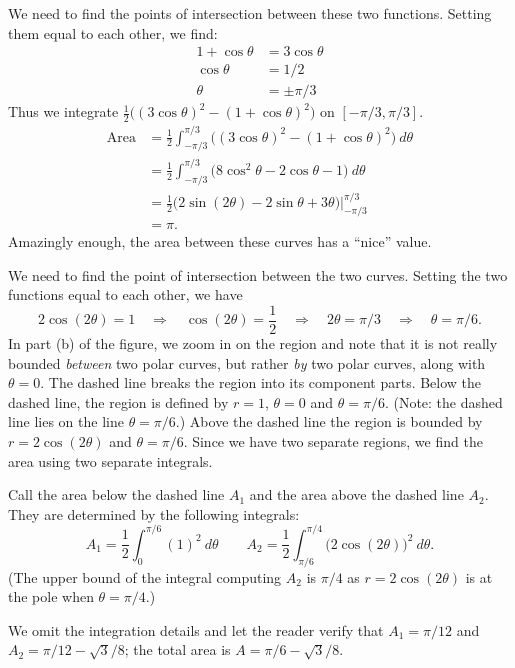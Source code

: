 {We need to find the points of intersection between these two functions. Setting them equal to each other, we find:
\begin{align*}
1+\cos\theta &= 3\cos \theta \\
 \cos\theta &=1/2\\
\theta &= \pm \pi/3
\end{align*}
Thus we integrate $\frac12\big((3\cos\theta)^2-(1+\cos\theta)^2\big)$ on $[-\pi/3,\pi/3]$.
\begin{align*}
	\text{Area}
	&= \frac12\int_{-\pi/3}^{\pi/3} \big((3\cos\theta)^2-(1+\cos\theta)^2\big)\ d\theta\\
	&= \frac12\int_{-\pi/3}^{\pi/3} \big( 8\cos^2\theta-2\cos\theta-1\big)\ d\theta \\
	&= \frac12\big(2\sin(2\theta) - 2\sin\theta+3\theta\big)\Bigg|_{-\pi/3}^{\pi/3}\\
	&= \pi.
\end{align*}
Amazingly enough, the area between these curves has a ``nice'' value.}

{We need to find the point of intersection between the two curves. Setting the two functions equal to each other, we have
$$2\cos(2\theta) = 1 \quad \Rightarrow \quad \cos(2\theta) = \frac12 \quad \Rightarrow \quad 2\theta = \pi/3\quad \Rightarrow \quad \theta=\pi/6.$$
In part (b) of the figure, we zoom in on the region and note that it is not really bounded \textit{between} two polar curves, but rather \textit{by} two polar curves, along with $\theta=0$. The dashed line breaks the region into its component parts. Below the dashed line, the region is defined by $r=1$, $\theta=0$ and $\theta = \pi/6$. (Note: the dashed line lies on the line $\theta=\pi/6$.) Above the dashed line the region is bounded by $r=2\cos(2\theta)$ and $\theta =\pi/6$. Since we have two separate regions, we find the area using two separate integrals.

Call the area below the dashed line $A_1$ and the area above the dashed line $A_2$. They are determined by the following integrals:
$$A_1 = \frac12\int_0^{\pi/6} (1)^2\ d\theta\qquad  A_2 = \frac12\int_{\pi/6}^{\pi/4} \big(2\cos(2\theta)\big)^2\ d\theta.$$
(The upper bound of the integral computing $A_2$ is $\pi/4$ as $r=2\cos(2\theta)$ is at the pole when $\theta=\pi/4$.)

We omit the integration details and let the reader verify that $A_1 = \pi/12$ and $A_2 = \pi/12-\sqrt{3}/8$; the total area is $A = \pi/6-\sqrt{3}/8$.}

